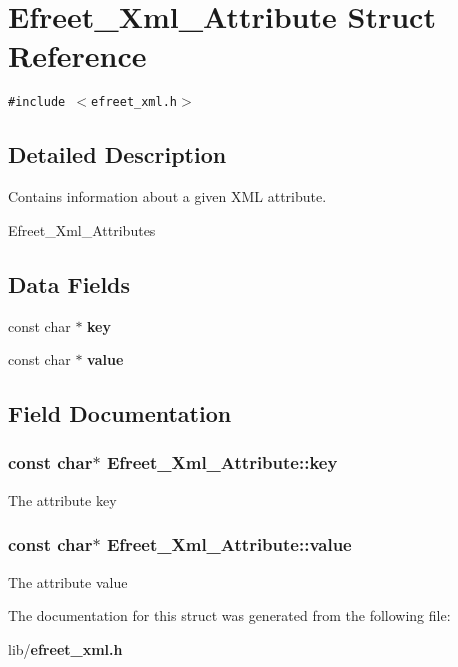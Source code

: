 \section{Efreet\_\-Xml\_\-Attribute Struct Reference}
\label{structEfreet__Xml__Attribute}
{\tt \#include $<$efreet\_\-xml.h$>$}



\subsection{Detailed Description}
Contains information about a given XML attribute. 

Efreet\_\-Xml\_\-Attributes \subsection*{Data Fields}
\begin{CompactItemize}
\item 
const char $\ast$ {\bf key}
\item 
const char $\ast$ {\bf value}
\end{CompactItemize}


\subsection{Field Documentation}
\subsubsection[key]{\setlength{\rightskip}{0pt plus 5cm}const char$\ast$ {\bf Efreet\_\-Xml\_\-Attribute::key}}\label{structEfreet__Xml__Attribute_4c3ff98a22f442e80ede45de49e69aae}


The attribute key 
\subsubsection[value]{\setlength{\rightskip}{0pt plus 5cm}const char$\ast$ {\bf Efreet\_\-Xml\_\-Attribute::value}}\label{structEfreet__Xml__Attribute_9e33fc206400d797c7c98ba17a3bceb3}


The attribute value 

The documentation for this struct was generated from the following file:\begin{CompactItemize}
\item 
lib/{\bf efreet\_\-xml.h}\end{CompactItemize}
